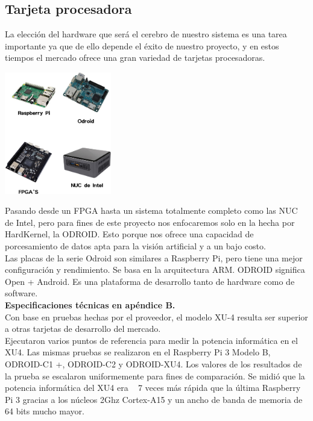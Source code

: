 \subsection{Tarjeta procesadora}
La elección del hardware que será el cerebro de nuestro sistema es una tarea importante ya que de ello depende el éxito de
nuestro proyecto, y en estos tiempos el mercado ofrece una gran variedad de tarjetas procesadoras.
\begin{center}
	\includegraphics[width=0.35\textwidth]{Contenido/Cuerpo/Capitulo2/Fig7.eps}
	\label{fig:MarcoTeorico:Fig12}
\end{center}
Pasando desde un FPGA hasta un sistema totalmente completo como las NUC de Intel, pero para fines de este proyecto nos enfocaremos
solo en la hecha por HardKernel, la ODROID. Esto porque nos ofrece una capacidad de porcesamiento de datos apta para la visión
artificial y a un bajo costo.\\
Las placas de la serie Odroid son similares a Raspberry Pi, pero tiene una mejor
configuración y rendimiento. Se basa en la arquitectura ARM. \cite{Book:Lentin2018}
ODROID significa Open + Android. Es una plataforma de desarrollo tanto de
hardware como de software.\\
\textbf{Especificaciones técnicas en apéndice B.} \\
Con base en pruebas hechas por el proveedor, el modelo XU-4 resulta ser superior
a otras tarjetas de desarrollo del mercado.\\
Ejecutaron varios puntos de referencia para medir la potencia informática en el XU4.
Las mismas pruebas se realizaron en el Raspberry Pi 3 Modelo B, ODROID-C1 +, ODROID-C2
y ODROID-XU4.
Los valores de los resultados de la prueba se escalaron uniformemente para fines de
comparación. Se midió que la potencia informática del XU4 era ~ 7 veces más rápida que
la última Raspberry Pi 3 gracias a los núcleos 2Ghz Cortex-A15 y un ancho de banda de
memoria de 64 bits mucho mayor.\\
